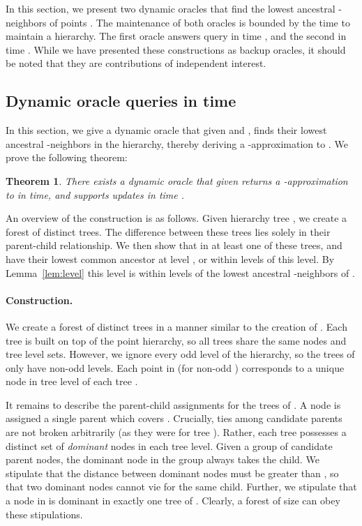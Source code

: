 \documentclass[11pt]{article}
\newtheorem{theorem}{Theorem}
\begin{document}
In this section, we present two dynamic oracles that find the lowest ancestral -neighbors of 
points . The maintenance of both oracles is bounded by the time to maintain a hierarchy. The 
first oracle answers query in time , and the second in time . 
While we have presented these constructions as backup oracles, it should be noted that they are 
contributions of independent interest.

\subsection{Dynamic oracle queries in  time}\label{sec:backup2}

In this section, we give a dynamic oracle that given  and , finds their lowest 
ancestral -neighbors in the hierarchy, thereby deriving a 
-approximation to . We prove the following theorem:

\begin{theorem}\label{thm:backup2}
There exists a dynamic oracle that given  returns a 
-approximation to
 in  time, and supports updates in time
.
\end{theorem}

An overview of the construction is as follows. Given hierarchy tree , we
create a forest of  distinct trees. The difference
between these trees lies solely in their parent-child relationship.
We then show that in at least one of these trees,  and  have their lowest
common ancestor at level , or within  levels of this
level. By Lemma~\ref{lem:level} this level is within  levels of the
lowest ancestral -neighbors of .


\paragraph{Construction.}
We create a forest of distinct trees  in a manner similar to the creation of .
Each tree is built on top of the point hierarchy, so all
trees share the same nodes and tree level sets. However,
we ignore every odd level of the hierarchy, so the
trees of  only have non-odd levels. Each point in
 (for non-odd ) corresponds to a unique node in tree
level  of each tree .

It remains to describe the parent-child assignments for the trees of
. A node  is assigned a single parent
 which covers . Crucially, ties among
candidate parents are not broken arbitrarily (as they were for
tree ). Rather, each tree  possesses a distinct
set of {\em dominant} nodes in each tree level. Given a group of
candidate parent nodes, the dominant node in the group always
takes the child. We stipulate that the distance between dominant
nodes  must be greater than , so that two
dominant nodes cannot vie for the same child. Further, we stipulate
that a node in  is dominant in exactly one tree of .
Clearly, a forest of size  can
obey these stipulations.
\end{document}

